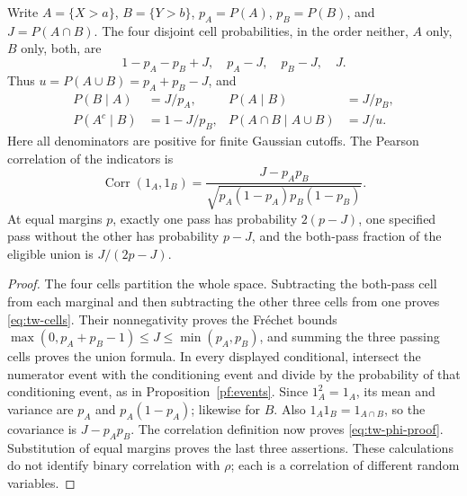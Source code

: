 \begin{proposition}
\label{tw:events}
Write \(A=\{X>a\}\), \(B=\{Y>b\}\), \(p_A=P(A)\), \(p_B=P(B)\),
and \(J=P(A\cap B)\). The four disjoint cell probabilities, in the order
neither, \(A\) only, \(B\) only, both, are
\begin{equation}
 1-p_A-p_B+J,\quad p_A-J,\quad p_B-J,\quad J.
 \label{eq:tw-cells}
\end{equation}
Thus \(u=P(A\cup B)=p_A+p_B-J\), and
\begin{align}
 P(B\mid A)&=J/p_A,&P(A\mid B)&=J/p_B,\\
 P(A^c\mid B)&=1-J/p_B,&
 P(A\cap B\mid A\cup B)&=J/u.
 \label{eq:tw-denominators}
\end{align}
Here all denominators are positive for finite Gaussian cutoffs.
The Pearson correlation of the indicators is
\begin{equation}
 \operatorname{Corr}(1_A,1_B)=
 \frac{J-p_Ap_B}{\sqrt{p_A(1-p_A)p_B(1-p_B)}}.
 \label{eq:tw-phi-proof}
\end{equation}
At equal margins \(p\), exactly one pass has probability \(2(p-J)\),
one specified pass without the other has probability \(p-J\), and the
both-pass fraction of the eligible union is \(J/(2p-J)\).
\end{proposition}
\begin{proof}
The four cells partition the whole space. Subtracting the both-pass cell
from each marginal and then subtracting the other three cells from one
proves \eqref{eq:tw-cells}. Their nonnegativity proves the Fr\'echet bounds
\(\max(0,p_A+p_B-1)\leq J\leq\min(p_A,p_B)\), and summing the three
passing cells proves the union formula. In every displayed conditional,
intersect the numerator event with the conditioning event and divide by
the probability of that conditioning event, as in Proposition~\ref{pf:events}.
Since \(1_A^2=1_A\), its mean and variance are \(p_A\) and
\(p_A(1-p_A)\); likewise for \(B\). Also \(1_A1_B=1_{A\cap B}\), so
the covariance is \(J-p_Ap_B\). The correlation definition now proves
\eqref{eq:tw-phi-proof}. Substitution of equal margins proves the last
three assertions. These calculations do not identify binary correlation
with \(\rho\); each is a correlation of different random variables.
\end{proof}

